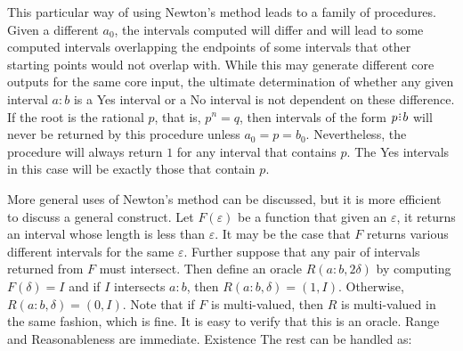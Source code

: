 \documentclass[12pt]{article}
\begin{document}
This particular way of using Newton's method leads to a family of procedures. Given a different $a_0$, the intervals computed will differ and will lead to some computed intervals overlapping the endpoints of some intervals that other starting points would not overlap with. While this may generate different core outputs for the same core input, the ultimate determination of whether any given interval $a:b$ is a Yes interval or a No interval is not dependent on these difference.  If the root is the rational $p$, that is, $p^n = q$,  then intervals of the form $p\rint b$ will never be returned by this procedure unless $a_0 = p = b_0$. Nevertheless, the procedure will always return $1$ for any interval that contains $p$. The Yes intervals in this case will be exactly those that contain $p$. 

More general uses of Newton's method can be discussed, but it is more efficient to discuss a general construct. Let $F(\varepsilon)$ be a function that given an $\varepsilon$, it returns an interval whose length is less than $\varepsilon$. It may be the case that $F$ returns various different intervals for the same $\varepsilon$. Further suppose that any pair of intervals returned from $F$ must intersect. Then define an oracle $R(a:b, 2\delta)$ by computing $F(\delta) = I$ and if $I$ intersects $a:b$, then $R(a:b, \delta) = (1, I)$. Otherwise, $R(a:b, \delta) = (0, I)$. Note that if $F$ is multi-valued, then $R$ is multi-valued in the same fashion, which is fine. It is easy to verify that this is an oracle. Range and Reasonableness are immediate. Existence The rest can be handled as:
\end{document}
